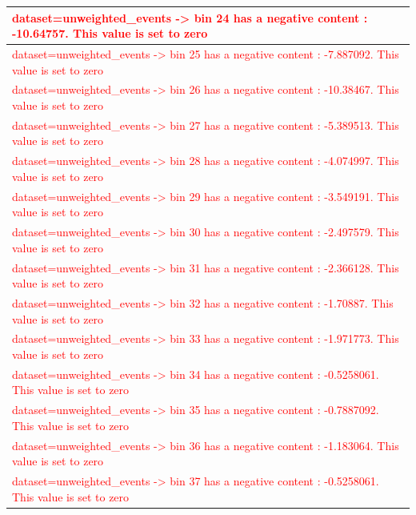 \documentclass[a4paper, 10pt]{article}
\begin{document}
\begin{table}[H]
\begin{center}
\begin{tabular}{|m{140.0mm}|}
      \hline
      {\cellcolor{white}\textcolor{red}{dataset=unweighted\_events -> bin 24 has a negative content : -10.64757. This value is set to zero}}\\
      \hline
      {\cellcolor{white}\textcolor{red}{dataset=unweighted\_events -> bin 25 has a negative content : -7.887092. This value is set to zero}}\\
      \hline
      {\cellcolor{white}\textcolor{red}{dataset=unweighted\_events -> bin 26 has a negative content : -10.38467. This value is set to zero}}\\
      \hline
      {\cellcolor{white}\textcolor{red}{dataset=unweighted\_events -> bin 27 has a negative content : -5.389513. This value is set to zero}}\\
      \hline
      {\cellcolor{white}\textcolor{red}{dataset=unweighted\_events -> bin 28 has a negative content : -4.074997. This value is set to zero}}\\
      \hline
      {\cellcolor{white}\textcolor{red}{dataset=unweighted\_events -> bin 29 has a negative content : -3.549191. This value is set to zero}}\\
      \hline
      {\cellcolor{white}\textcolor{red}{dataset=unweighted\_events -> bin 30 has a negative content : -2.497579. This value is set to zero}}\\
      \hline
      {\cellcolor{white}\textcolor{red}{dataset=unweighted\_events -> bin 31 has a negative content : -2.366128. This value is set to zero}}\\
      \hline
      {\cellcolor{white}\textcolor{red}{dataset=unweighted\_events -> bin 32 has a negative content : -1.70887. This value is set to zero}}\\
      \hline
      {\cellcolor{white}\textcolor{red}{dataset=unweighted\_events -> bin 33 has a negative content : -1.971773. This value is set to zero}}\\
      \hline
      {\cellcolor{white}\textcolor{red}{dataset=unweighted\_events -> bin 34 has a negative content : -0.5258061. This value is set to zero}}\\
      \hline
      {\cellcolor{white}\textcolor{red}{dataset=unweighted\_events -> bin 35 has a negative content : -0.7887092. This value is set to zero}}\\
      \hline
      {\cellcolor{white}\textcolor{red}{dataset=unweighted\_events -> bin 36 has a negative content : -1.183064. This value is set to zero}}\\
      \hline
      {\cellcolor{white}\textcolor{red}{dataset=unweighted\_events -> bin 37 has a negative content : -0.5258061. This value is set to zero}}\\

\end{tabular}
\end{center}
\end{table}
\end{document}
